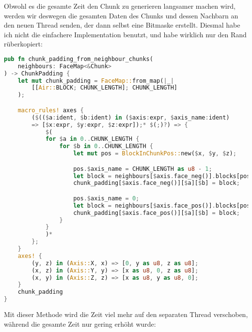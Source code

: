 Obwohl es die gesamte Zeit den Chunk zu generieren
langsamer machen wird, werden wir deswegen die gesamten
Daten des Chunks und dessen Nachbarn an den neuen
Thread senden, der dann selbst eine Bitmaske erstellt.
Diesmal habe ich nicht die einfachere Implementation
benutzt, und habe wirklich nur den Rand rüberkopiert:

\begin{lstlisting}[language=Rust]
pub fn chunk_padding_from_neighbour_chunks(
	neighbours: FaceMap<&Chunk>
) -> ChunkPadding {
	let mut chunk_padding = FaceMap::from_map(|_|
		[[Air::BLOCK; CHUNK_LENGTH]; CHUNK_LENGTH]
	);

	macro_rules! axes {
		($(($a:ident, $b:ident) in ($axis:expr, $axis_name:ident)
		=> [$x:expr, $y:expr, $z:expr]);* $(;)?) => {
			$(
			for $a in 0..CHUNK_LENGTH {
				for $b in 0..CHUNK_LENGTH {
					let mut pos = BlockInChunkPos::new($x, $y, $z);

					pos.$axis_name = CHUNK_LENGTH as u8 - 1;
					let block = neighbours[$axis.face_neg()].blocks[pos];
					chunk_padding[$axis.face_neg()][$a][$b] = block;

					pos.$axis_name = 0;
					let block = neighbours[$axis.face_pos()].blocks[pos];
					chunk_padding[$axis.face_pos()][$a][$b] = block;
				}
			}
			)*
		};
	}
	axes! {
		(y, z) in (Axis::X, x) => [0, y as u8, z as u8];
		(x, z) in (Axis::Y, y) => [x as u8, 0, z as u8];
		(x, y) in (Axis::Z, z) => [x as u8, y as u8, 0];
	}
	chunk_padding
}
\end{lstlisting}

Mit dieser Methode wird die Zeit viel mehr auf den
separaten Thread verschoben, während die gesamte
Zeit nur gering erhöht wurde:

\vspace{0.3cm}

